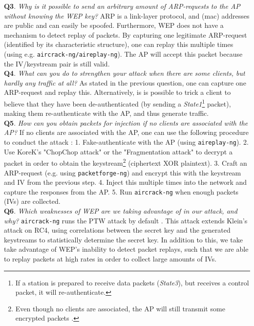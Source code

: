 \documentclass[a4paper,11pt]{article}
\begin{document}
\noindent\textbf{Q3}. \textit{Why is it possible to send an arbitrary amount of ARP-requests to the AP without knowing the WEP key?} ARP is a link-layer protocol, and (\gls{mac}) addresses are public and can easily be spoofed. Furthermore, WEP does not have a mechanism to detect replay of packets. By capturing one legitimate ARP-request (identified by its characteristic structure), one can replay this multiple times (using e.g. \texttt{aircrack-ng/aireplay-ng}). The AP will accept this packet because the IV/keystream pair is still valid. \\

\noindent\textbf{Q4}. \textit{What can you do to strengthen your attack when there are some clients, but hardly any traffic at all?} As stated in the previous question, one can capture one ARP-request and replay this. Alternatively, is is possible to trick a client to believe that they have been de-authenticated (by sending a \textit{State1}\footnote{If a station is prepared to receive data packets (\textit{State3}), but receives a control packet, it will re-authenticate.} packet), making them re-authenticate with the AP, and thus generate traffic. \\

\noindent\textbf{Q5}. \textit{How can you obtain packets for injection if no clients are associated with the AP?} If no clients are associated with the AP, one can use the following procedure to conduct the attack \cite{noclients}: 1. Fake-authenticate with the AP (using \texttt{aireplay-ng}). 2. Use KoreK's "ChopChop attack" or the "Fragmentation attack" to decrypt a packet in order to obtain the keystream\footnote{Even though no clients are associated, the AP will still transmit some encrypted packets \cite{noclients}.} (ciphertext XOR plaintext). 3. Craft an ARP-request (e.g. using \texttt{packetforge-ng}) and encrypt this with the keystream and IV from the previous step. 4. Inject this multiple times into the network and capture the responses from the AP. 5. Run \texttt{aircrack-ng} when enough packets (IVs) are collected.\\

\noindent\textbf{Q6}. \textit{Which weaknesses of WEP are we taking advantage of in our attack, and why?} \texttt{aircrack-ng} runs the PTW attack by default \cite{aircrack}. This attack extends Klein's attack on RC4, using correlations between the secret key and the generated keystreams to statistically determine the secret key. In addition to this, we take take advantage of WEP's inability to detect packet replays, such that we are able to replay packets at high rates in order to collect large amounts of IVs. \\
\end{document}
